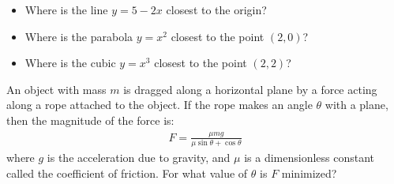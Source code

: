 \documentclass[parskip=full]{scrartcl}
\numberwithin{equation}{section}
\theoremstyle{definition}
\begin{document}
\begin{problems}
  \begin{itemize}
    \item Where is the line $y=5-2x$ closest to the origin?
    \item Where is the parabola $y=x^2$ closest to the point $(2,0)$?
    \item Where is the cubic $y=x^3$ closest to the point $(2,2)$?
  \end{itemize}
  \item An object with mass $m$ is dragged along a horizontal
  plane by a force acting along a rope attached to the object.
  If the rope makes an angle $\theta$ with a plane, then the magnitude of the force is:
  \begin{align*}
    F=\frac{\mu m g}{\mu \sin \theta+\cos\theta}
  \end{align*}
  where $g$ is the acceleration due to gravity, and $\mu$ is a dimensionless 
  constant called the coefficient of friction. For what value of $\theta$ 
  is $F$ minimized?
\end{problems}
\end{document}
